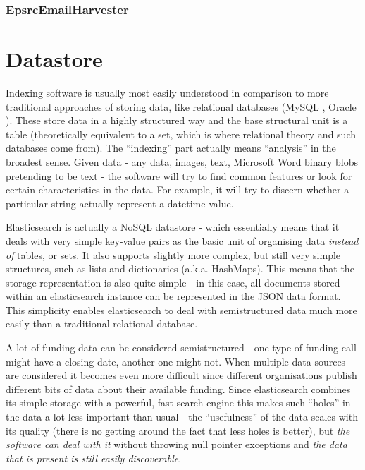 \subsubsection{EpsrcEmailHarvester}

\section{Datastore}
\label{design-datastore}
 Indexing software is usually most easily understood in comparison to more traditional approaches of storing data, like relational databases (MySQL \cite{mysql}, Oracle \cite{oracle}). These store data in a highly structured way and the base structural unit is a table (theoretically equivalent to a set, which is where relational theory and such databases come from). The ``indexing'' part actually means ``analysis'' in the broadest sense. Given data - any data, images, text, Microsoft Word binary blobs pretending to be text - the software will try to find common features or look for certain characteristics in the data. For example, it will try to discern whether a particular string actually represent a datetime value.
 
 Elasticsearch is actually a NoSQL datastore - which essentially means that it deals with very simple key-value pairs as the basic unit of organising data \emph{instead of} tables, or sets. It also supports slightly more complex, but still very simple structures, such as lists and dictionaries (a.k.a. HashMaps). This means that the storage representation is also quite simple - in this case, all documents stored within an elasticsearch instance can be represented in the JSON data format. This simplicity enables elasticsearch to deal with semistructured data much more easily than a traditional relational database.
 
 A lot of funding data can be considered semistructured - one type of funding call might have a closing date, another one might not. When multiple data sources are considered it becomes even more difficult since different organisations publish different bits of data about their available funding. Since elasticsearch combines its simple storage with a powerful, fast search engine this makes such ``holes'' in the data a lot less important than usual - the ``usefulness'' of the data scales with its quality (there is no getting around the fact that less holes is better), but \emph{the software can deal with it} without throwing null pointer exceptions and \emph{the data that is present is still easily discoverable}.
 
